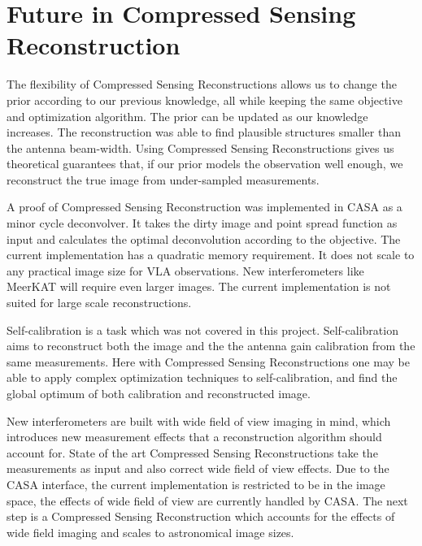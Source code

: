 \section{Future in Compressed Sensing Reconstruction}
The flexibility of Compressed Sensing Reconstructions allows us to change the prior according to our previous knowledge, all while keeping the same objective and optimization algorithm. The prior can be updated as our knowledge increases. The reconstruction was able to find plausible structures smaller than the antenna beam-width. Using Compressed Sensing Reconstructions gives us theoretical guarantees that, if our prior models the observation well enough, we reconstruct the true image from under-sampled measurements.

A proof of Compressed Sensing Reconstruction was implemented in CASA as a minor cycle deconvolver. It takes the dirty image and point spread function as input and calculates the optimal deconvolution according to the objective. The current implementation has a quadratic memory requirement. It does not scale to any practical image size for VLA observations. New interferometers like MeerKAT will require even larger images. The current implementation is not suited for large scale reconstructions. 

Self-calibration is a task which was not covered in this project. Self-calibration aims to reconstruct both the image and the the antenna gain calibration from the same measurements. Here with Compressed Sensing Reconstructions one may be able to apply complex optimization techniques to self-calibration, and find the global optimum of both calibration and reconstructed image.

New interferometers are built with wide field of view imaging in mind, which introduces new measurement effects that a reconstruction algorithm should account for. State of the art Compressed Sensing Reconstructions take the measurements as input and also correct wide field of view effects. Due to the CASA interface, the current implementation is restricted to be in the image space, the effects of wide field of view are currently handled by CASA. The next step is a Compressed Sensing Reconstruction which accounts for the effects of wide field imaging and scales to astronomical image sizes.